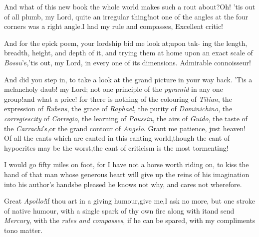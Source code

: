 \documentclass{article}
\begin{document}
\vspace{-\parskip}
And what of this new book the whole world makes such a rout
about?\tsk Oh! ’tis out of all plumb, my Lord,\tsh\break
quite an irregular thing!\tsk not one of
the angles at the four corners was a right angle.\tsk I had my rule
and compasses,
\break
Excellent critic!

\tsh And for the epick poem, your\break
lordship bid me look at;\tsk upon tak-\break
ing the length, breadth, height, and\break
depth of it, and trying them at home\break
upon an exact scale of \textit{Bossu}’s,\tsh ’tis out,\break
my Lord, in every one of its dimensions.\break
\tsh Admirable connoisseur!

\tsh And did you step in, to take a look at the grand
picture in your way back.\tsk\break
\tsh ’Tis a melancholy daub! my Lord;\break
not one principle of the \textit{pyramid} in any one
group!\tsh and what a price!\tsh\break
for there is nothing of
the colouring of \textit{Titian},\tsk
the expression of \textit{Rubens},\tsk
the grace of \textit{Raphael},\tsk
the purity of 
\textit{Dominichino},\tsk
the \textit{corregiescity} of \textit{Corregio},\tsk
the learning of \textit{Poussin},\tsk
the airs of \textit{Guido},\tsk
the taste of the \textit{Carrachi}’s,\tsk\break or
the grand contour of \textit{Angelo}.\tsh\break
Grant me patience, just heaven!\tsh\break
Of all the cants which are canted in this canting world,\tsk though the cant of
hypocrites may be the worst,\tsh the cant of criticism is the most tormenting!

I would go fifty miles on foot, for I have not a horse worth
riding on, to kiss the hand of that man whose generous heart will
give up the reins of his imagination into his author’s
hands\tsh be pleased he knows not why, and cares not
wherefore.

Great \textit{Apollo!}\@ if thou art in a giving humour,\tsk give
me,\tsk I ask no more, but one stroke of native humour,
with
a single spark of thy own fire along with it\tsh and send
\textit{Mercury}, with the \textit{rules and compasses}, if he can be
spared, with my compliments to\tsh no matter.
\end{document}
